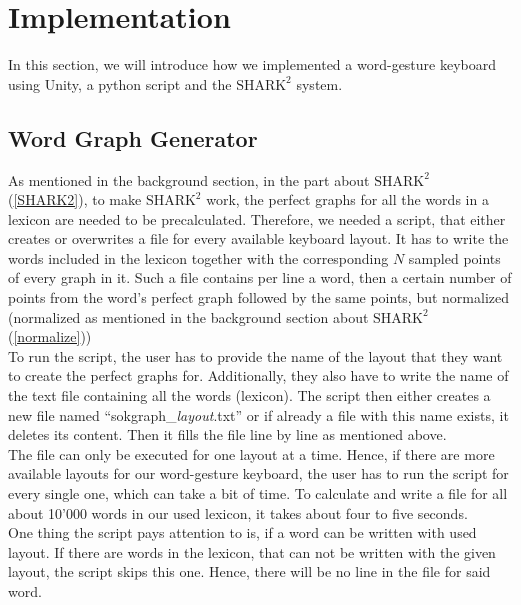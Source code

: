 \chapter{Implementation}

In this section, we will introduce how we implemented a word-gesture keyboard using Unity, a python script and the $\text{SHARK}^2$ system.

\section{Word Graph Generator}
As mentioned in the background section, in the part about $\text{SHARK}^2$ (\ref{SHARK2}), to make $\text{SHARK}^2$ work, the perfect graphs for all the words in a lexicon are needed to be precalculated. Therefore, we needed a script, that either creates or overwrites a file for every available keyboard layout. It has to write the words included in the lexicon together with the corresponding $N$ sampled points of every graph in it. Such a file contains per line a word, then a certain number of points from the word's perfect graph followed by the same points, but normalized (normalized as mentioned in the background section about $\text{SHARK}^2$ (\ref{normalize}))\\
To run the script, the user has to provide the name of the layout that they want to create the perfect graphs for. Additionally, they also have to write the name of the text file containing all the words (lexicon). The script then either creates a new file named ``sokgraph\_\textit{layout}.txt'' or if already a file with this name exists, it deletes its content. Then it fills the file line by line as mentioned above.\\
The file can only be executed for one layout at a time. Hence, if there are more available layouts for our word-gesture keyboard, the user has to run the script for every single one, which can take a bit of time. To calculate and write a file for all about 10'000 words in our used lexicon, it takes about four to five seconds.\\
One thing the script pays attention to is, if a word can be written with used layout. If there are words in the lexicon, that can not be written with the given layout, the script skips this one. Hence, there will be no line in the file for said word. 

